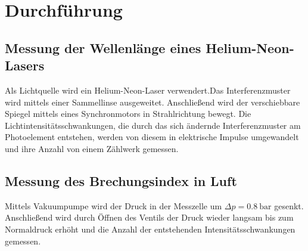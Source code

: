 \section{Durchführung}
\label{sec:Durchführung}

\subsection{Messung der Wellenlänge eines Helium-Neon-Lasers}
\label{sec:WL}
Als Lichtquelle wird ein Helium-Neon-Laser verwendert.Das Interferenzmuster wird mittels einer Sammellinse ausgeweitet. Anschließend wird der verschiebbare Spiegel mittels eines Synchronmotors in Strahlrichtung bewegt. Die Lichtintensitätsschwankungen, die durch das sich ändernde Interferenzmuster am Photoelement entstehen, werden von diesem in elektrische Impulse umgewandelt und ihre Anzahl von einem Zählwerk gemessen.
\subsection{Messung des Brechungsindex in Luft}
Mittels Vakuumpumpe wird der Druck in der Messzelle um $\Delta p = \SI{0,8}{\bar}$ gesenkt. Anschließend wird durch Öffnen des Ventils der Druck wieder langsam bis zum Normaldruck erhöht und die Anzahl der entstehenden Intensitätsschwankungen gemessen.
